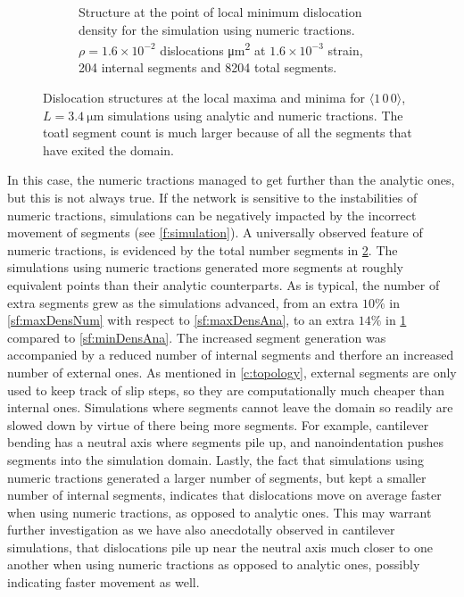 \begin{figure}
\begin{subfigure}[t]{0.45\linewidth}
        \caption[Structure at the point of local minimum dislocation density for the simulation using analytic tractions.]{Structure at the point of local minimum dislocation density for the simulation using numeric tractions. $\rho = 1.6\times 10^{-2}$ dislocations \si{\micro\metre^{2}} at $1.6 \times 10^{-3}$ strain, 204 internal segments and 8204 total segments.}
        \label{sf:minDensNum}
    \end{subfigure}
    \caption{Dislocation structures at the local maxima and minima for $\langle 1\, 0\, 0\rangle$, $L = \SI{3.4}{\micro\metre}$ simulations using analytic and numeric tractions. The toatl segment count is much larger because of all the segments that have exited the domain.}
    \label{f:minMaxDens}
\end{figure}

In this case, the numeric tractions managed to get further than the analytic ones, but this is not always true. If the network is sensitive to the instabilities of numeric tractions, simulations can be negatively impacted by the incorrect movement of segments (see \cref{f:simulation}). A universally observed feature of numeric tractions, is evidenced by the total number segments in \cref{f:minMaxDens}. The simulations using numeric tractions generated more segments at roughly equivalent points than their analytic counterparts. As is typical, the number of extra segments grew as the simulations advanced, from an extra $10\%$ in \cref{sf:maxDensNum} with respect to \cref{sf:maxDensAna}, to an extra $14\%$ in \cref{sf:minDensNum} compared to \cref{sf:minDensAna}. The increased segment generation was accompanied by a reduced number of internal segments and therfore an increased number of external ones. As mentioned in \cref{c:topology}, external segments are only used to keep track of slip steps, so they are computationally much cheaper than internal ones. Simulations where segments cannot leave the domain so readily are slowed down by virtue of there being more segments. For example, cantilever bending has a neutral axis where segments pile up, and nanoindentation pushes segments into the simulation domain. Lastly, the fact that simulations using numeric tractions generated a larger number of segments, but kept a smaller number of internal segments, indicates that dislocations move on average faster when using numeric tractions, as opposed to analytic ones. This may warrant further investigation as we have also anecdotally observed in cantilever simulations, that dislocations pile up near the neutral axis much closer to one another when using numeric tractions as opposed to analytic ones, possibly indicating faster movement as well.

